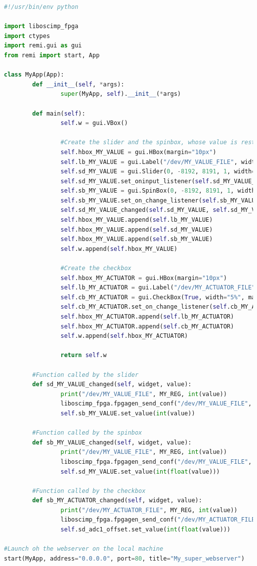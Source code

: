 \documentclass[12pt,oneside]{article}
\begin{document}
\vspace{-0.2cm}
\begin{lstlisting}[language=Python]
#!/usr/bin/env python

import liboscimp_fpga
import ctypes
import remi.gui as gui
from remi import start, App

class MyApp(App):
		def __init__(self, *args):
				super(MyApp, self).__init__(*args)

		def main(self):
				self.w = gui.VBox()
				
				#Create the slider and the spinbox, whose value is restricted to -8192 to 8191 (no overflow)
				self.hbox_MY_VALUE = gui.HBox(margin="10px")
				self.lb_MY_VALUE = gui.Label("/dev/MY_VALUE_FILE", width="20%", margin="50px")
				self.sd_MY_VALUE = gui.Slider(0, -8192, 8191, 1, width="60%", margin="10px")
				self.sd_MY_VALUE.set_oninput_listener(self.sd_MY_VALUE_changed)
				self.sb_MY_VALUE = gui.SpinBox(0, -8192, 8191, 1, width="20%", margin="10px")
				self.sb_MY_VALUE.set_on_change_listener(self.sb_MY_VALUE_changed)
				self.sd_MY_VALUE_changed(self.sd_MY_VALUE, self.sd_MY_VALUE.get_value())
				self.hbox_MY_VALUE.append(self.lb_MY_VALUE)
				self.hbox_MY_VALUE.append(self.sd_MY_VALUE)
				self.hbox_MY_VALUE.append(self.sb_MY_VALUE)
				self.w.append(self.hbox_MY_VALUE)

				#Create the checkbox
				self.hbox_MY_ACTUATOR = gui.HBox(margin="10px")
				self.lb_MY_ACTUATOR = gui.Label("/dev/MY_ACTUATOR_FILE", width="20%", margin="50px")
				self.cb_MY_ACTUATOR = gui.CheckBox(True, width="5%", margin="10px")
				self.cb_MY_ACTUATOR.set_on_change_listener(self.cb_MY_ACTUATOR_changed)
				self.hbox_MY_ACTUATOR.append(self.lb_MY_ACTUATOR)
				self.hbox_MY_ACTUATOR.append(self.cb_MY_ACTUATOR)
				self.w.append(self.hbox_MY_ACTUATOR)

				return self.w
		
		#Function called by the slider
		def sd_MY_VALUE_changed(self, widget, value):
				print("/dev/MY_VALUE_FILE", MY_REG, int(value))
				liboscimp_fpga.fpgagen_send_conf("/dev/MY_VALUE_FILE", MY_REG, int(value))
				self.sb_MY_VALUE.set_value(int(value))

		#Function called by the spinbox
		def sb_MY_VALUE_changed(self, widget, value):
				print("/dev/MY_VALUE_FILE", MY_REG, int(value))
				liboscimp_fpga.fpgagen_send_conf("/dev/MY_VALUE_FILE", MY_REG, int(value))
				self.sd_MY_VALUE.set_value(int(float(value)))
				
		#Function called by the checkbox
		def sb_MY_ACTUATOR_changed(self, widget, value):
				print("/dev/MY_ACTUATOR_FILE", MY_REG, int(value))
				liboscimp_fpga.fpgagen_send_conf("/dev/MY_ACTUATOR_FILE", MY_REG2, int(value))
				self.sd_adc1_offset.set_value(int(float(value)))

#Launch oh the webserver on the local machine
start(MyApp, address="0.0.0.0", port=80, title="My_super_webserver")
\end{lstlisting}
\end{document}
